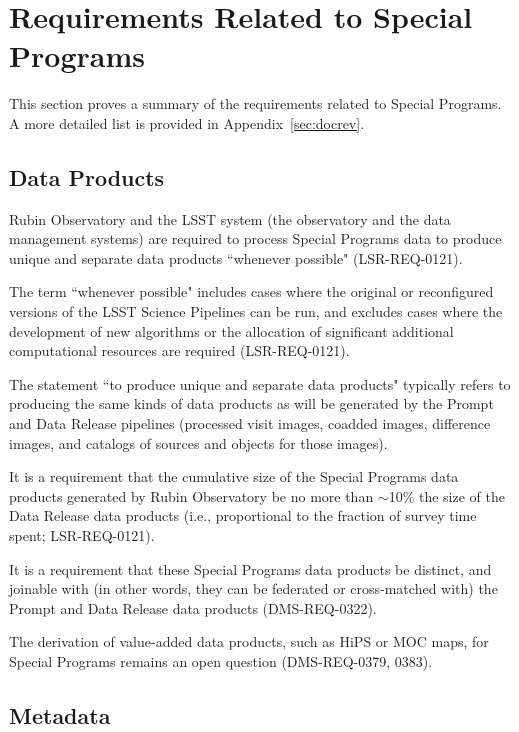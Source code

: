 \section{Requirements Related to Special Programs}\label{sec:req}

This section proves a summary of the requirements related to Special Programs.
A more detailed list is provided in Appendix~\ref{sec:docrev}.


\subsection{Data Products}\label{ssec:req_dp}

Rubin Observatory and the LSST system (the observatory and the data 
management systems) are required to process Special Programs data to 
produce unique and separate data products ``whenever possible" 
(LSR-REQ-0121).

The term ``whenever possible" includes cases where the original or 
reconfigured versions of the LSST Science Pipelines can be run, and 
excludes cases where the development of new algorithms or the allocation 
of significant additional computational resources are required 
(LSR-REQ-0121).

The statement ``to produce unique and separate data products" typically 
refers to producing the same kinds of data products as will be generated 
by the Prompt and Data Release pipelines (processed visit images, coadded 
images, difference images, and catalogs of sources and objects for those 
images).

It is a requirement that the cumulative size of the Special Programs data 
products generated by Rubin Observatory be no more than $\sim$10\% the 
size of the Data Release data products (i.e., proportional to the fraction 
of survey time spent; LSR-REQ-0121).

It is a requirement that these Special Programs data products be distinct, 
and joinable with (in other words, they can be federated or cross-matched 
with) the Prompt and Data Release data products (DMS-REQ-0322).

The derivation of value-added data products, such as HiPS or MOC maps, for 
Special Programs remains an open question (DMS-REQ-0379, 0383).


\subsection{Metadata}\label{ssec:req_meta}

